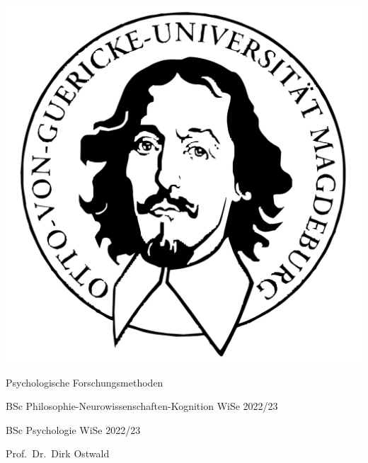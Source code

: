 \documentclass[
  8pt,
  ignorenonframetext,
]{beamer}
\author{}
\date{\vspace{-2.5em}}
\begin{document}
\begin{frame}[plain]{}
\protect\hypertarget{section}{}
\center

\begin{center}\includegraphics[width=0.2\linewidth]{1_Abbildungen/pfm_1_otto} \end{center}

\vspace{2mm}

\Large

Psychologische Forschungsmethoden \vspace{6mm}

\normalsize

BSc Philosophie-Neurowissenschaften-Kognition WiSe 2022/23

BSc Psychologie WiSe 2022/23

\large
\vspace{6mm}

Prof.~Dr.~Dirk Ostwald
\end{frame}
\end{document}
